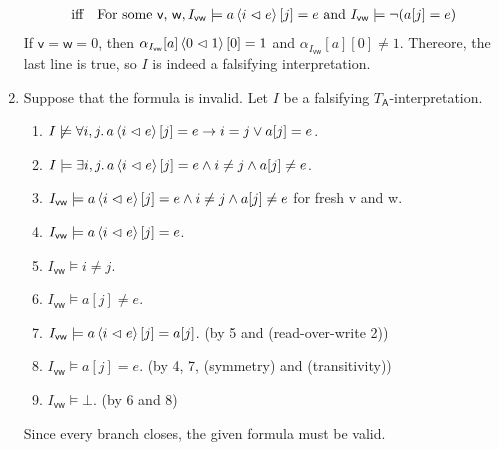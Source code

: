 \begin{exer}[3.4]
\begin{enumerate}[label=(\alph*)]
\begin{align*}
                &\text{iff}\quad \text{For some \textsf{v}, \textsf{w}}, I_{\textsf{vw}} \models a\ev{i \vartriangleleft e}[j] = e \text{ and } I_{\textsf{vw}} \models \neg(a[j] = e) \\
            \end{align*}
            If $\textsf{v} = \textsf{w} = 0$, then $\alpha_{I_{\textsf{vw}}}[a]\ev{0 \vartriangleleft 1}[0] = 1$ and $\alpha_{I_{\textsf{vw}}}[a][0] \ne 1$.
            Thereore, the last line is true, so $I$ is indeed a falsifying interpretation.
        \item
            Suppose that the formula is invalid.
            Let $I$ be a falsifying $T_{\textsf{A}}$-interpretation.
            \begin{enumerate}[label=\arabic*.]
                \item %
                    $I \not\models \forall i, j.\, a\ev{i \vartriangleleft e}[j] = e \rightarrow i = j \lor a[j] = e$.
                \item %
                    $I \models \exists i, j.\, a\ev{i \vartriangleleft e}[j] = e \land i \ne j \land a[j] \ne e$.
                \item %
                    $I_{\textsf{vw}} \models a\ev{i \vartriangleleft e}[j] = e \land i \ne j \land a[j] \ne e$ for fresh \textsf{v} and \textsf{w}.
                \item %
                    $I_{\textsf{vw}} \models a\ev{i \vartriangleleft e}[j] = e$.
                \item %
                    $I_{\textsf{vw}} \models i \ne j$.
                \item %
                    $I_{\textsf{vw}} \models a[j] \ne e$.
                \item %
                    $I_{\textsf{vw}} \models a\ev{i \vartriangleleft e}[j] = a[j]$. (by 5 and \textsf{(read-over-write 2)})
                \item %
                    $I_{\textsf{vw}} \models a[j] = e$. (by 4, 7, \textsf{(symmetry)} and \textsf{(transitivity)})
                \item %
                    $I_{\textsf{vw}} \models \bot$. (by 6 and 8)
            \end{enumerate}
            Since every branch closes, the given formula must be valid.
    \end{enumerate}
\end{exer}
